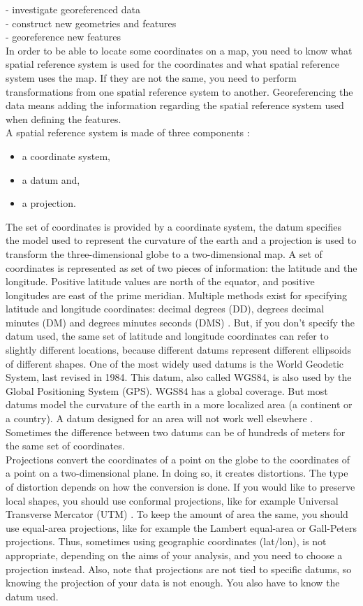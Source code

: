 \documentclass {article}
\begin{document}
- investigate georeferenced data\\
- construct new geometries and features\\
- georeference new features\\
In order to be able to locate some coordinates on a map, you need to know what spatial reference system is used for the coordinates and what spatial reference system uses the map. If they are not the same, you need to perform transformations from one spatial reference system to another. Georeferencing the data means adding the information regarding the spatial reference system used when defining the features.\\
A spatial reference system is made of three components \cite{garrard_geoprocessing_2016}: \begin{itemize}
\item a coordinate system,
\item a datum and,
\item a projection.
\end{itemize}
The set of coordinates is provided by a coordinate system, the datum specifies the model used to represent the curvature of the earth and a projection is used to transform the three-dimensional globe to a two-dimensional map. 
A set of coordinates is represented as set of two pieces of information: the latitude and the longitude. Positive latitude values are north of the equator, and positive longitudes are east of the prime meridian. Multiple methods exist for specifying latitude and longitude coordinates: decimal degrees (DD), degrees decimal minutes (DM) and degrees minutes seconds (DMS) \cite{garrard_geoprocessing_2016}. But, if you don't specify the datum used, the same set of latitude and longitude coordinates can refer to slightly different locations, because different datums represent different ellipsoids of different shapes.
 One of the most widely used datums is the World Geodetic System, last revised in 1984. This datum, also called WGS84, is also used by the Global Positioning System (GPS). WGS84 has a global coverage. But most datums model the curvature of the earth in a more localized area (a continent or a country). A datum designed for an area will not work well elsewhere \cite{garrard_geoprocessing_2016}. Sometimes the difference between two datums can be of hundreds of meters for the same set of coordinates.
\\
 Projections convert the coordinates of a point on the globe to the coordinates of a point on a two-dimensional plane. In doing so, it creates distortions. The type of distortion depends on how the conversion is done. If you would like to preserve local shapes, you should use conformal projections, like for example Universal Transverse Mercator (UTM) \cite{garrard_geoprocessing_2016}. To keep the amount of area the same, you should use equal-area projections, like for example the Lambert equal-area or Gall-Peters projections. Thus, sometimes using geographic coordinates (lat/lon), is not appropriate, depending on the aims of your analysis, and you need to choose a projection instead. Also, note that projections are not tied to specific datums, so knowing the projection of your data is not enough. You also have to know the datum used.           
\end{document}
